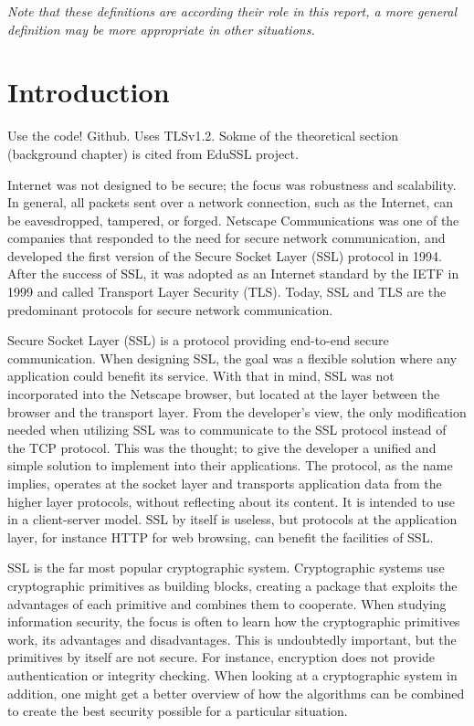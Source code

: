 \documentclass[12pt,a4paper,titlepage]{report}
\begin{document}
\textit{Note that these definitions are according their role in this report, a more general definition may be more appropriate in other situations.}

\newpage
{}
\chapter{Introduction}
\pagestyle{fancy}
\setcounter{page}{1} %

Use the code! Github. Uses TLSv1.2. Sokme of the theoretical section (background chapter) is cited from EduSSL project.

Internet was not designed to be secure; the focus was robustness and scalability. In general, all packets sent over a network connection, such as the Internet, can be eavesdropped, tampered, or forged. Netscape Communications was one of the companies that responded to the need for secure network communication, and developed the first version of the Secure Socket Layer (SSL) protocol in 1994. After the success of SSL, it was adopted as an Internet standard by the IETF in 1999 and called Transport Layer Security (TLS). Today, SSL and TLS are the predominant protocols for secure network communication. \cite{berbecaru} 

Secure Socket Layer (SSL) is a protocol providing end-to-end secure communication. When designing SSL, the goal was a flexible solution where any application could benefit its service. With that in mind, SSL was not incorporated into the Netscape browser, but located at the layer between the browser and the transport layer. From the developer's view, the only modification needed when utilizing SSL was to communicate to the SSL protocol instead of the TCP protocol. This was the thought; to give the developer a unified and simple solution to implement into their applications. The protocol, as the name implies, operates at the socket layer and transports application data from the higher layer protocols, without reflecting about its content. It is intended to use in a client-server model. SSL by itself is useless, but protocols at the application layer, for instance HTTP for web browsing, can benefit the facilities of SSL.

SSL is the far most popular cryptographic system. Cryptographic systems use cryptographic primitives as building blocks, creating a package that exploits the advantages of each primitive and combines them to cooperate. When studying information security, the focus is often to learn how the cryptographic primitives work, its advantages and disadvantages. This is undoubtedly important, but the primitives by itself are not secure. For instance, encryption does not provide authentication or integrity checking. When looking at a cryptographic system in addition, one might get a better overview of how the algorithms can be combined to create the best security possible for a particular situation. \cite{wikiCryptosystem,wikiCryptoPrimitive}
\end{document}
